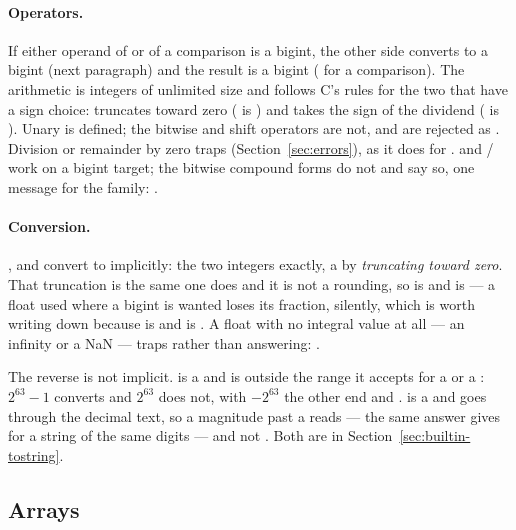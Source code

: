 \paragraph{Operators.} If either operand of \ic{+ - * / \%} or of a
comparison is a bigint, the other side converts to a bigint (next paragraph)
and the result is a bigint ( for a comparison). The arithmetic is
integers of unlimited size and follows C's rules for the two that have a
sign choice: \ic{/} truncates toward zero ( is
) and \ic{\%} takes the sign of the dividend ( is ). Unary \ic{-} is defined; the bitwise and shift operators
are not, and are rejected as . Division or remainder by zero traps
(Section~\ref{sec:errors}), as it does for .
\ic{+= -= *= /= \%=} and \ic{++}/\ic{--} work on a bigint target; the
bitwise compound forms do not and say so, one message for the family:
.

\paragraph{Conversion.} ,  and  convert to
 implicitly: the two integers exactly, a  by
\emph{truncating toward zero}. That truncation is the same one
 does and it is not a rounding, so  is  and
 is  --- a float used where a bigint is wanted loses its
fraction, silently, which is worth writing down because  is
 and is . A float with no integral value at all --- an
infinity or a NaN --- traps rather than answering:
.

The reverse is not implicit.  is a  and is
 outside the range it accepts for a  or a :
$2^{63} - 1$ converts and $2^{63}$ does not, with $-2^{63}$ the other end and
.  is
a  and goes through the decimal text, so a magnitude past a
 reads  --- the same answer  gives for a
string of the same digits --- and not . Both are in
Section~\ref{sec:builtin-tostring}.

\subsection{Arrays}
\label{sec:type-arrays}

